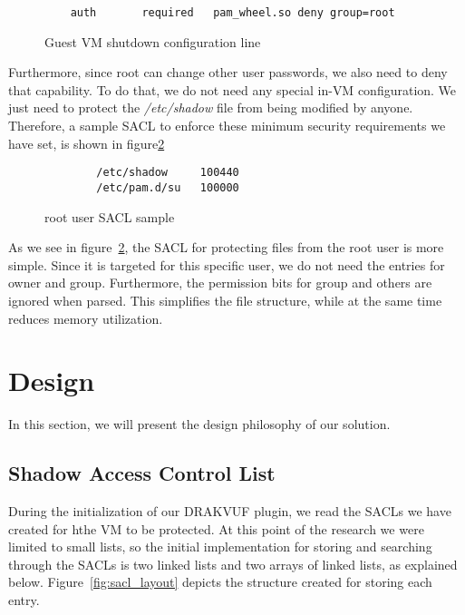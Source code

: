 \begin{figure}[ht]
	\centering
	\begin{lstlisting}
	auth       required   pam_wheel.so deny group=root	
	\end{lstlisting}
	\caption{Guest \ac{VM} shutdown configuration line}
	\label{fig:pam}
\end{figure}

\par Furthermore, since root can change other user passwords, we also need to deny that capability. To do that, we do not need any special in-\ac{VM} configuration. We just need to protect the \textit{/etc/shadow} file from being modified by anyone. Therefore, a sample \ac{SACL} to enforce these minimum security requirements we have set, is shown in figure\ref{fig:root_sacl}

\begin{figure}[ht]
	\centering
	\begin{lstlisting}
		/etc/shadow     100440
		/etc/pam.d/su   100000
	\end{lstlisting}
	\caption{root user \ac{SACL} sample}
	\label{fig:root_sacl}
\end{figure}

\par As we see in figure~\ref{fig:root_sacl}, the \ac{SACL} for protecting files from the root user is more simple. Since it is targeted for this specific user, we do not need the entries for owner and group. Furthermore, the permission bits for group and others are ignored when parsed. This simplifies the file structure, while at the same time reduces memory utilization.



\section{Design}\label{sec:design}
In this section, we will present the design philosophy of our solution.

\subsection{Shadow Access Control List}\label{sub:sacl}
During the initialization of our DRAKVUF plugin, we read the \ac{SACL}s we have created for hthe \ac{VM} to be protected. At this point of the research we were limited to small lists, so the initial implementation for storing and searching through the \ac{SACL}s is two linked lists and two arrays of linked lists, as explained below. Figure~\ref{fig:sacl_layout} depicts the structure created for storing each entry.

